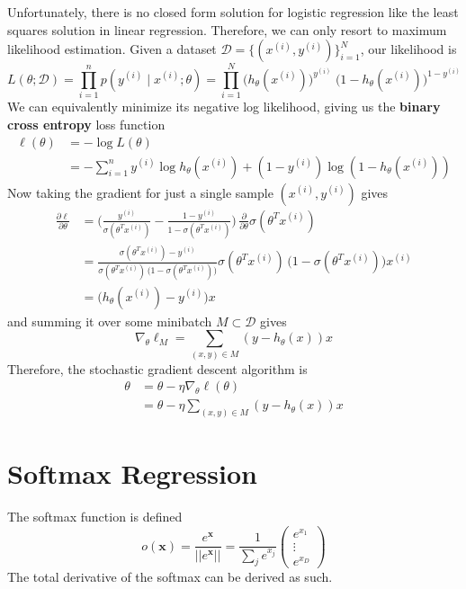 \documentclass{article}
\theoremstyle{definition}
\begin{document}
  Unfortunately, there is no closed form solution for logistic regression like the least squares solution in linear regression. Therefore, we can only resort to maximum likelihood estimation. Given a dataset $\mathcal{D} = \{(x^{(i)}, y^{(i)})\}_{i=1}^N$, our likelihood is 
  \[L(\theta ; \mathcal{D}) = \prod_{i=1}^n p(y^{(i)} \;|\; x^{(i)} ; \theta) = \prod_{i=1}^N  \big( h_\theta (x^{(i)} )\big)^{y^{(i)}} \; \big( 1 - h_\theta (x^{(i)})\big)^{1-y^{(i)}}\]
  We can equivalently minimize its negative log likelihood, giving us the \textbf{binary cross entropy} loss function
  \begin{align*}
      \ell(\theta) & = -\log L(\theta) \\
      & = -\sum_{i=1}^n y^{(i)} \log h_\theta (x^{(i)}) + (1 - y^{(i)}) \log (1 - h_\theta (x^{(i)}))
  \end{align*}
  Now taking the gradient for just a single sample $(x^{(i)}, y^{(i)})$ gives 
  \begin{align*}
      \frac{\partial \ell}{\partial \theta}  & = \bigg( \frac{y^{(i)}}{\sigma(\theta^T x^{(i)})} - \frac{1 - y^{(i)}}{1 - \sigma(\theta^T x^{(i)})} \bigg) \, \frac{\partial}{\partial \theta} \sigma (\theta^T x^{(i)}) \\
      & = \frac{\sigma(\theta^T x^{(i)}) - y^{(i)}}{\sigma(\theta^T x^{(i)}) \, \big( 1 - \sigma(\theta^T x^{(i)}) \big)} \sigma(\theta^T x^{(i)}) \, \big( 1 - \sigma(\theta^T x^{(i)}) \big) x^{(i)} \\
      & = \big( h_\theta (x^{(i)}) - y^{(i)} \big) x
  \end{align*}
  and summing it over some minibatch $M \subset \mathcal{D}$ gives 
  \[\nabla_\theta \ell_M = \sum_{(x, y) \in M} (y - h_\theta(x)) x\]
  Therefore, the stochastic gradient descent algorithm is 
  \begin{align*}
      \theta & = \theta - \eta \nabla_\theta \ell (\theta) \\
      & = \theta - \eta \sum_{(x, y) \in M} (y - h_\theta(x)) x
  \end{align*}

  \section{Softmax Regression}

  The softmax function is defined 
  \[o(\mathbf{x}) = \frac{e^{\mathbf{x}}}{||e^{\mathbf{x}}||} = \frac{1}{\sum_j e^{x_j}}\begin{pmatrix} e^{x_1} \\ \vdots \\ e^{x_D} \end{pmatrix}\]
  The total derivative of the softmax can be derived as such. 
\end{document}
